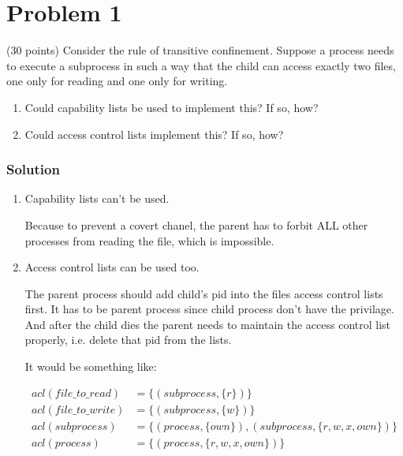 
\section*{Problem 1}

(30 points) Consider the rule of transitive confinement. 
Suppose a process needs to execute a subprocess in such a way that the child can access exactly two files, one only for reading and one only for writing.

\begin{enumerate}
    \item Could capability lists be used to implement this? If so, how?
    \item Could access control lists implement this? If so, how?
\end{enumerate}

\subsubsection*{Solution}

\begin{enumerate}
    \item Capability lists can't be used. 
    
    Because to prevent a covert chanel, the parent has to forbit ALL other processes from reading the file, which is impossible.

    \item Access control lists can be used too.
    
    The parent process should add child's pid into the files access control lists first.
    It has to be parent process since child process don't have the privilage.
    And after the child dies the parent needs to maintain the access control list properly, i.e. delete that pid from the lists.

    It would be something like:

    \begin{align*}
         acl(file\_to\_read) & = \{ (subprocess, \{r\}) \} \\
         acl(file\_to\_write) & = \{ (subprocess, \{w\}) \} \\
         acl(subprocess) & = \{ (process, \{own\}), (subprocess, \{r, w, x, own\}) \} \\
         acl(process) & = \{ (process, \{r, w, x, own\}) \} \\
    \end{align*}
\end{enumerate}